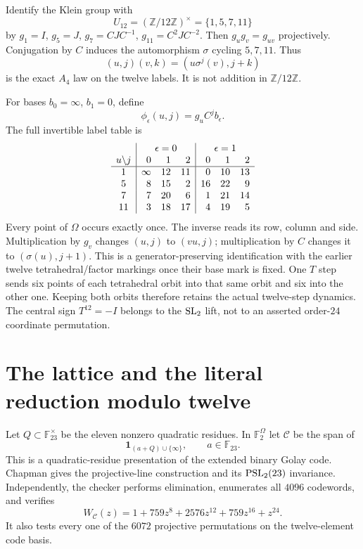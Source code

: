 \documentclass[11pt,reqno]{amsart}
\theoremstyle{definition}\newtheorem{definition}[theorem]{Definition}
\theoremstyle{remark}\newtheorem{remark}[theorem]{Remark}
\newcommand{\Z}{\mathbb Z}\newcommand{\Q}{\mathbb Q}\newcommand{\R}{\mathbb R}\newcommand{\C}{\mathbb C}\newcommand{\F}{\mathbb F}
\begin{document}
Identify the Klein group with
\[
U_{12}=(\Z/12\Z)^\times=\{1,5,7,11\}
\]
by $g_1=I$, $g_5=J$, $g_7=CJC^{-1}$, $g_{11}=C^2JC^{-2}$. Then $g_ug_v=g_{uv}$ projectively. Conjugation by $C$ induces the automorphism $\sigma$ cycling $5,7,11$. Thus
\[
(u,j)(v,k)=(u\sigma^j(v),j+k)
\]
is the exact $A_4$ law on the twelve labels. It is not addition in $\Z/12\Z$.

For bases $b_0=\infty$, $b_1=0$, define
\begin{equation}\label{eq:labels}
\phi_\epsilon(u,j)=g_u C^j b_\epsilon.
\end{equation}
The full invertible label table is
\[
\begin{array}{c|rrr|rrr}
&\multicolumn{3}{c|}{\epsilon=0}&\multicolumn{3}{c}{\epsilon=1}\\
u\backslash j&0&1&2&0&1&2\\\hline
1&\infty&12&11&0&10&13\\
5&8&15&2&16&22&9\\
7&7&20&6&1&21&14\\
11&3&18&17&4&19&5
\end{array}
\]
Every point of $\Omega$ occurs exactly once. The inverse reads its row, column and side. Multiplication by $g_v$ changes $(u,j)$ to $(vu,j)$; multiplication by $C$ changes it to $(\sigma(u),j+1)$. This is a generator-preserving identification with the earlier twelve tetrahedral/factor markings once their base mark is fixed.
One $T$ step sends six points of each tetrahedral orbit into that same orbit and six into the other one. Keeping both orbits therefore retains the actual twelve-step dynamics. The central sign $T^{12}=-I$ belongs to the $\operatorname{SL}_2$ lift, not to an asserted order-$24$ coordinate permutation.

\section{The lattice and the literal reduction modulo twelve}
Let $Q\subset\F_{23}^\times$ be the eleven nonzero quadratic residues. In $\F_2^\Omega$ let $\mathcal C$ be the span of
\[
\mathbf1_{(a+Q)\cup\{\infty\}},\qquad a\in\F_{23}.
\]
This is a quadratic-residue presentation of the extended binary Golay code. Chapman \cite[Section 1.6, p.~10]{Chapman} gives the projective-line construction and its $\operatorname{PSL}_2(23)$ invariance. Independently, the checker performs elimination, enumerates all $4096$ codewords, and verifies
\begin{equation}\label{eq:weights}
W_{\mathcal C}(z)=1+759z^8+2576z^{12}+759z^{16}+z^{24}.
\end{equation}
It also tests every one of the $6072$ projective permutations on the twelve-element code basis.
\end{document}
